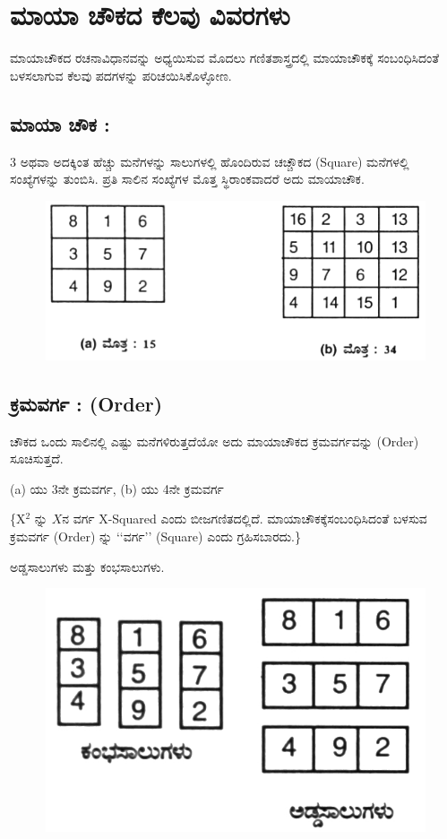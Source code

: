 \chapter{ಮಾಯಾ ಚೌಕದ ಕೆಲವು ವಿವರಗಳು}

ಮಾಯಾಚೌಕದ ರಚನಾವಿಧಾನವನ್ನು ಅಧ್ಯಯಿಸುವ ಮೊದಲು ಗಣಿತಶಾಸ್ತ್ರದಲ್ಲಿ ಮಾಯಾಚೌಕಕ್ಕೆ ಸಂಬಂಧಿಸಿದಂತೆ ಬಳಸಲಾಗುವ ಕೆಲವು ಪದಗಳನ್ನು ಪರಿಚಯಿಸಿಕೊಳ್ಳೋಣ.

\section*{ಮಾಯಾ ಚೌಕ :}

3 ಅಥವಾ ಅದಕ್ಕಿಂತ ಹೆಚ್ಚು ಮನೆಗಳನ್ನು ಸಾಲುಗಳಲ್ಲಿ ಹೊಂದಿರುವ ಚಚ್ಚೌಕದ (Square) ಮನೆಗಳಲ್ಲಿ ಸಂಖ್ಯೆಗಳನ್ನು ತುಂಬಿಸಿ. ಪ್ರತಿ ಸಾಲಿನ ಸಂಖ್ಯೆಗಳ ಮೊತ್ತ ಸ್ಥಿರಾಂಕವಾದರೆ ಅದು ಮಾಯಾಚೌಕ.
\begin{figure}[H]
\includegraphics{src/figures/chap2/fig2.1.jpg}
\end{figure}

\section*{ಕ್ರಮವರ್ಗ : (Order)}

ಚೌಕದ ಒಂದು ಸಾಲಿನಲ್ಲಿ ಎಷ್ಟು ಮನೆಗಳಿರುತ್ತದೆಯೋ ಅದು ಮಾಯಾಚೌಕದ ಕ್ರಮವರ್ಗವನ್ನು (Order) ಸೂಚಿಸುತ್ತದೆ.

(a) ಯು 3ನೇ ಕ್ರಮವರ್ಗ, (b) ಯು 4ನೇ ಕ್ರಮವರ್ಗ

\{X$^2$ ನ್ನು $X$ನ ವರ್ಗ  X-Squared ಎಂದು ಬೀಜಗಣಿತದಲ್ಲಿದೆ. ಮಾಯಾಚೌಕಕ್ಕೆ\break ಸಂಬಂಧಿಸಿದಂತೆ ಬಳಸುವ ಕ್ರಮವರ್ಗ (Order) ನ್ನು ‘‘ವರ್ಗ’’ (Square) ಎಂದು ಗ್ರಹಿಸ\-ಬಾರದು.\}

\newpage

ಅಡ್ಡಸಾಲುಗಳು ಮತ್ತು ಕಂಭಸಾಲುಗಳು.
\begin{figure}[H]
\includegraphics[scale=.9]{src/figures/chap2/fig2.2.jpg}
\end{figure}

